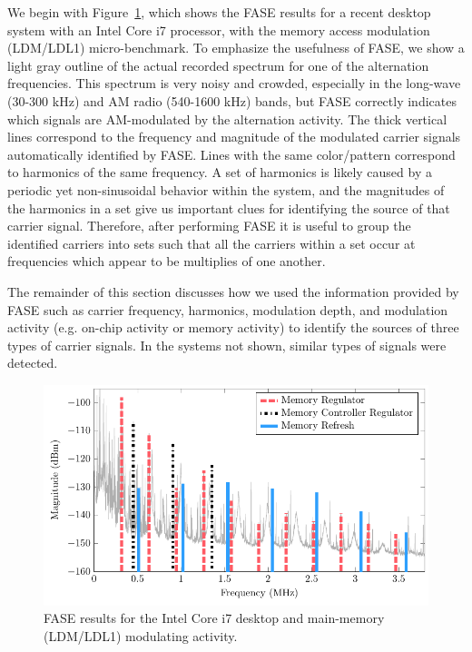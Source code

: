 We begin with Figure~\ref{spect_ldm}, which shows the FASE results for a recent desktop system with an Intel Core i7 processor, with the memory access modulation (LDM/LDL1) micro-benchmark. To emphasize the usefulness of FASE, we show a light gray outline of the actual recorded spectrum for one of the alternation frequencies. This spectrum is very noisy and crowded, especially in the long-wave (30-300 kHz) and AM radio (540-1600 kHz) bands, but FASE correctly indicates which signals are AM-modulated by the alternation activity. The thick vertical lines correspond to the frequency and magnitude of the modulated carrier signals automatically identified by FASE. Lines with the same color/pattern correspond to harmonics of the same frequency. A set of harmonics is likely caused by a periodic yet non-sinusoidal behavior within the system, and the magnitudes of the harmonics in a set give us important clues for identifying the source of that carrier signal. Therefore, after performing FASE it is useful to group the identified carriers into sets such that all the carriers within a set occur at frequencies which appear to be multiplies of one another.

The remainder of this section discusses how we used the information provided by FASE such as carrier frequency, harmonics, modulation depth, and modulation activity (e.g. on-chip activity or memory activity) to identify the sources of three types of carrier signals. In the systems not shown, similar types of signals were detected. 

\begin{figure}[tbh]
\centering
\includegraphics[trim=0.0in 0in 0in 0in,clip,width=5in]{../fase/Data/spect_ldm.pdf}%
\caption{FASE results for the Intel Core i7 desktop and main-memory (LDM/LDL1) modulating activity.}%
\label{spect_ldm}%
\end{figure}

